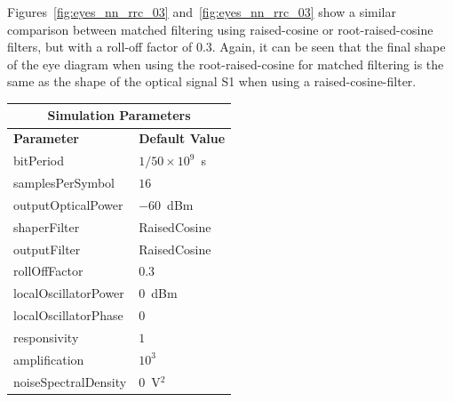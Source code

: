 Figures~\ref{fig:eyes_nn_rrc_03} and~\ref{fig:eyes_nn_rrc_03} show a similar
comparison between matched filtering using raised-cosine or root-raised-cosine
filters, but with a roll-off factor of 0.3. Again, it can be seen that the
final shape of the eye diagram when using the root-raised-cosine for matched
filtering is the same as the shape of the optical signal S1 when using a
raised-cosine-filter.
\begin{table}[H]
	\centering
	\footnotesize
	\begin{tabular}{|l|l|}
		\hline
		\multicolumn{2}{|c|}{ \textbf{Simulation Parameters} } \\
		\hline
		\textbf{Parameter}     & \textbf{Default Value}                                     \\\hline
		bitPeriod              & $1/50\times10^9$~s														\\\hline
		samplesPerSymbol       & $16$                                                       \\\hline
		outputOpticalPower     & $-60$~dBm 													\\ \hline
		shaperFilter	       & RaisedCosine												\\ \hline
		outputFilter		   & RaisedCosine												\\ \hline
		rollOffFactor		   & 0.3														\\ \hline
		localOscillatorPower   & $0$~dBm                                                    \\ \hline
		localOscillatorPhase   & $0$                                                        \\ \hline
		responsivity           & $1$                                                        \\ \hline
		amplification          & $10^3$                                                     \\ \hline
		noiseSpectralDensity   & $0$~V$^2$                             					\\ \hline
	\end{tabular}
\end{table}
